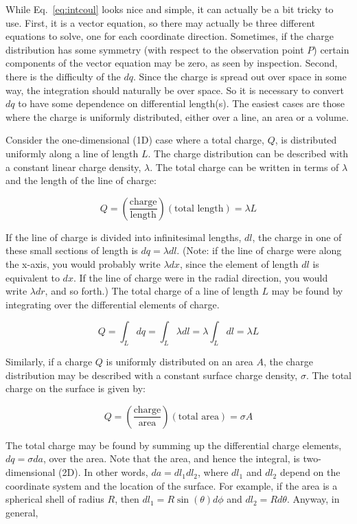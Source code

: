 \documentclass[12pt]{article}
\begin{document}
\begin{flushleft}
While Eq.~\ref{eq:intcoul} looks nice and simple, it can actually be a bit tricky to use.  First, it is a vector equation, so there may actually be three different equations to solve, one for each coordinate direction.  Sometimes, if the charge distribution has some symmetry (with respect to the observation point $P$) certain components of the vector equation may be zero, as seen by inspection.  Second, there is the difficulty of the $dq$.  Since the charge is spread out over space in some way, the integration should naturally be over space.  So it is necessary to convert $dq$ to have some dependence on differential length(s).  The easiest cases are those where the charge is uniformly distributed, either over a line, an area or a volume.

Consider the one-dimensional (1D) case where a total charge, $Q$, is distributed uniformly along a line of length $L$.  The charge distribution can be described with a constant linear charge density, $\lambda$.  The total charge can be written in terms of $\lambda$ and the length of the line of charge:

\[
Q = \left( \frac{ \mbox{charge} }{ \mbox{length} } \right) \left( \mbox{total length} \right) = \lambda L
\]

If the line of charge is divided into infinitesimal lengths, $dl$, the charge in one of these small sections of length is $dq=\lambda dl$.  (Note: if the line of charge were along the x-axis, you would probably write  $\lambda dx$, since the element of length $dl$ is equivalent to $dx$.  If the line of charge were in the radial direction, you would write $\lambda dr$, and so forth.)  The total charge of a line of length $L$ may be found by integrating over the differential elements of charge.

\[
Q = \int_{L} dq = \int_{L} \lambda dl = \lambda \int_{L}  dl = \lambda L
\]

Similarly, if a charge $Q$ is uniformly distributed on an area $A$, the charge distribution may be described with a constant surface charge density, $\sigma$.  The total charge on the surface is given by:

\[
Q = \left( \frac{ \mbox{charge} }{ \mbox{area} } \right) \left( \mbox{total area} \right) = \sigma A
\]

The total charge may be found by summing up the differential charge elements, $dq=\sigma da$, over the area.  Note that the area, and hence the integral, is two-dimensional (2D).  In other words, $da=dl_{1}dl_{2}$, where $dl_{1}$ and $dl_{2}$ depend on the coordinate system and the location of the surface.  For example, if the area is a spherical shell of radius $R$, then $dl_{1}=R\sin{(\theta)}d\phi$ and $dl_{2}=Rd\theta$.  Anyway, in general,


\end{flushleft}
\end{document}
